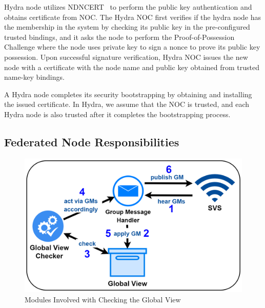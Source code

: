 Hydra node utilizes NDNCERT~\cite{} to perform the public key authentication and obtains certificate from NOC.
The Hydra NOC first verifies if the hydra node has the membership in the system by checking its public key in the pre-configured trusted bindings, and it asks the node to perform the Proof-of-Possession Challenge where the node uses private key to sign a nonce to prove its public key possession.
Upon successful signature verification, Hydra NOC issues the new node with a certificate with the node name and public key obtained from trusted name-key bindings.

A Hydra node completes its security bootstrapping by obtaining and installing the issued certificate.
In Hydra, we assume that the NOC is trusted, and each Hydra node is also trusted after it completes the bootstrapping process. 
\subsection{Federated Node Responsibilities}

\begin{figure}[!ht]
    \centering
    \includegraphics[width=\columnwidth]{visuals/checker-sys.png}
    \caption{Modules Involved with Checking the Global View}
    \label{fig:checker-sys}
\end{figure}

